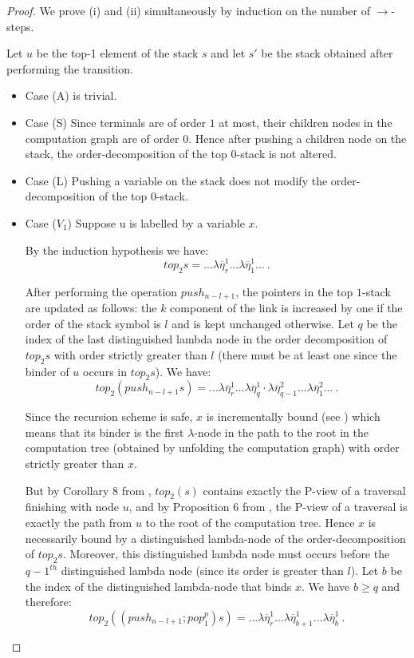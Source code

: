 \documentclass{article}
\theoremstyle{remark}
\theoremstyle{definition}
\begin{document}
\begin{proof}
We prove (i) and (ii) simultaneously by induction on the number of $\rightarrow$-steps.

Let $u$ be the top-1 element of the stack $s$ and let $s'$ be the stack obtained
after performing the transition.
\begin{itemize}
\item Case (A) is trivial.

\item Case (S) Since terminals are of order $1$ at most, their children nodes in the computation graph are of order $0$. Hence after pushing a children node on the stack, the order-decomposition of the top $0$-stack is not altered.

\item Case (L) Pushing a variable on the stack does not modify the order-decomposition of the top $0$-stack.

\item Case ($V_1$) Suppose u is labelled by a variable $x$.

By the induction hypothesis we have:
$$ top_2 s = \ldots \lambda \overline{\eta}_r^1  
\ldots  \lambda \overline{\eta}_1^1   \ldots \ .$$


After performing the operation $push_{n-l+1}$, the pointers in the top $1$-stack are updated as follows: the $k$ component of the link is increased by one if the order of the stack symbol is $l$ and is kept unchanged otherwise. Let $q$ be the index of the last distinguished lambda node in the order decomposition of $top_2 s$ with order strictly greater than $l$ (there must be at least one since the binder of $u$ occurs in $top_2 s$). We have:
$$ top_2 (push_{n-l+1} s) = \ldots 
\lambda \overline{\eta}_r^1 
\ldots  \lambda \overline{\eta}_{q}^1 \cdot
\lambda \overline{\eta}_{q-1}^2 \ldots
 \lambda \overline{\eta}_1^2 \ldots
\ .$$


Since the recursion scheme is safe, $x$ is incrementally bound (see \cite{blumong:safelambdacalculus}) which means that its binder is the first $\lambda$-node in the path to the root in the computation tree (obtained by unfolding the computation graph) with order strictly greater than $x$.

But by Corollary 8 from \cite{hague-sto07}, $top_2(s)$ contains exactly the P-view of a traversal finishing with node $u$, and by Proposition 6 from \cite{OngLics2006}, the P-view of a traversal is exactly the path from $u$ to the root of the computation tree. Hence $x$ is necessarily bound by a distinguished lambda-node of the order-decomposition of $top_2 s$. Moreover, this distinguished lambda node must occurs before the $q-1^{th}$ distinguished lambda node (since its order is greater than $l$). Let $b$ be the index of the distinguished lambda-node that binds $x$. We have $b\geq q$ and therefore:
$$ top_2 ((push_{n-l+1};pop_1^p) s) =
\ldots \lambda \overline{\eta}_r^1  
\ldots \lambda \overline{\eta}_{b+1}^1
\ldots \lambda \overline{\eta}_{b}^1\ .$$


\end{itemize}
\end{proof}
\end{document}
